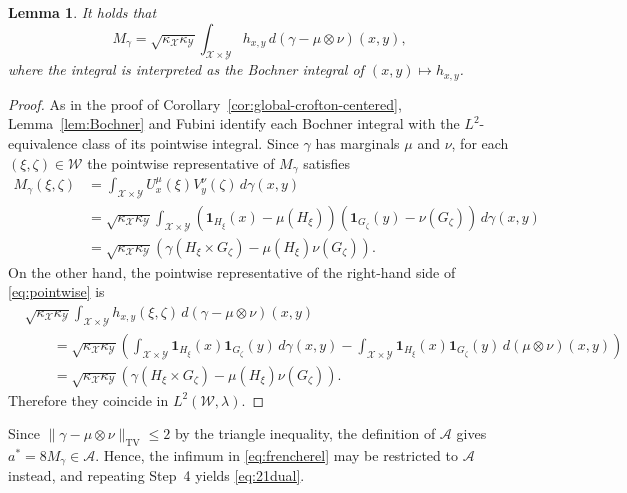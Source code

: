 \documentclass[11pt]{amsart}
\newtheorem{lemma}[theorem]{Lemma}
\theoremstyle{definition}
\theoremstyle{remark}
\newcommand{\1}{\mathbf{1}}
\newcommand{\one}{\mathbf{1}}
\numberwithin{equation}{section}
\newcommand{\TV}{\mathrm{TV}}
\begin{document}
\begin{lemma}\label{lem:Mgamma representation}
It holds that
\begin{equation}\label{eq:pointwise}
M_\gamma
=
\sqrt{\kappa_{\mathcal X}\kappa_{\mathcal Y}}
\int_{\mathcal X\times\mathcal Y}
h_{x,y}\,d(\gamma-\mu\otimes\nu)(x,y),
\end{equation}
where the integral is interpreted as the Bochner integral of
$(x,y)\mapsto h_{x,y}$.
\end{lemma}
\begin{proof}
    As in the proof of Corollary~\ref{cor:global-crofton-centered},
Lemma~\ref{lem:Bochner} and Fubini identify each Bochner integral with
the $L^2$-equivalence class of its pointwise integral. Since $\gamma$ has
marginals $\mu$ and $\nu$, for each $(\xi,\zeta)\in\mathcal W$ the
pointwise representative of $M_\gamma$ satisfies
\begin{align*}
M_\gamma(\xi,\zeta)
&=
\int_{\mathcal X\times\mathcal Y}
U_x^\mu(\xi)V_y^\nu(\zeta)\,d\gamma(x,y)\\
&=
\sqrt{\kappa_\mathcal X\kappa_\mathcal Y}
\int_{\mathcal X\times\mathcal Y}
\left(\one_{H_\xi}(x)-\mu(H_\xi)\right)
\left(\one_{G_\zeta}(y)-\nu(G_\zeta)\right)
\,d\gamma(x,y)\\
&=
\sqrt{\kappa_\mathcal X\kappa_\mathcal Y}
\left(
\gamma(H_\xi\times G_\zeta)
-\mu(H_\xi)\nu(G_\zeta)
\right).
\end{align*}
On the other hand, the pointwise representative of the right-hand side of
\eqref{eq:pointwise} is
\begin{align*}
&\sqrt{\kappa_\mathcal X\kappa_\mathcal Y}
\int_{\mathcal X\times\mathcal Y}
h_{x,y}(\xi,\zeta)\,d(\gamma-\mu\otimes\nu)(x,y)\\
&\qquad=
\sqrt{\kappa_\mathcal X\kappa_\mathcal Y}
\left(
\int_{\mathcal X\times\mathcal Y}
\one_{H_\xi}(x)\one_{G_\zeta}(y)\,d\gamma(x,y)
-
\int_{\mathcal X\times\mathcal Y}
\one_{H_\xi}(x)\one_{G_\zeta}(y)\,d(\mu\otimes\nu)(x,y)
\right)\\
&\qquad=
\sqrt{\kappa_\mathcal X\kappa_\mathcal Y}
\left(
\gamma(H_\xi\times G_\zeta)
-\mu(H_\xi)\nu(G_\zeta)
\right).
\end{align*}
Therefore they coincide in $L^2(\mathcal W,\lambda)$.
\end{proof}
Since
$\|\gamma-\mu\otimes\nu\|_{\TV}\leq2$ by the triangle inequality,
the definition of $\mathcal A$ gives $a^*=8M_\gamma\in\mathcal A$.
Hence, the infimum in \eqref{eq:frencherel} may be
restricted to $\mathcal A$ instead, and repeating Step~4 yields \eqref{eq:21dual}.
\end{document}
